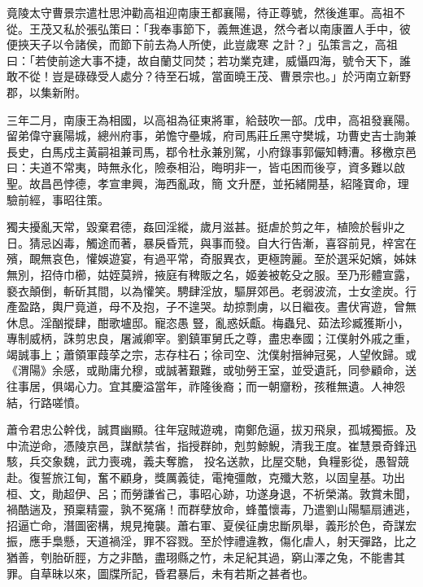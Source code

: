 \begin{pinyinscope}
 竟陵太守曹景宗遣杜思沖勸高祖迎南康王都襄陽，待正尊號，然後進軍。高祖不從。王茂又私於張弘策曰：「我奉事節下，義無進退，然今者以南康置人手中，彼便挾天子以令諸侯，而節下前去為人所使，此豈歲寒
 之計？」弘策言之，高祖曰：「若使前途大事不捷，故自蘭艾同焚；若功業克建，威懾四海，號令天下，誰敢不從！豈是碌碌受人處分？待至石城，當面曉王茂、曹景宗也。」於沔南立新野郡，以集新附。



 三年二月，南康王為相國，以高祖為征東將軍，給鼓吹一部。戊申，高祖發襄陽。留弟偉守襄陽城，總州府事，弟憺守壘城，府司馬莊丘黑守樊城，功曹史吉士詢兼長史，白馬戍主黃嗣祖兼司馬，鄀令杜永兼別駕，小府錄事郭儼知轉漕。移檄京邑曰：夫道不常夷，時無永化，險泰相沿，晦明非一，皆屯困而後亨，資多難以啟聖。故昌邑悖德，孝宣聿興，海西亂政，簡
 文升歷，並拓緒開基，紹隆寶命，理驗前經，事昭往策。



 獨夫擾亂天常，毀棄君德，姦回淫縱，歲月滋甚。挺虐於剪之年，植險於髫丱之日。猜忌凶毒，觸途而著，暴戾昏荒，與事而發。自大行告漸，喜容前見，梓宮在殯，靦無哀色，懽娛遊宴，有過平常，奇服異衣，更極誇麗。至於選采妃嬪，姊妹無別，招侍巾櫛，姑姪莫辨，掖庭有稗販之名，姬姜被乾殳之服。至乃形體宣露，褻衣顛倒，斬斫其間，以為懽笑。騁肆淫放，驅屏郊邑。老弱波流，士女塗炭。行產盈路，輿尸竟道，母不及抱，子不遑哭。劫掠剽虜，以日繼夜。晝伏宵遊，曾無休息。淫酗摐肆，酣歌壚邸。寵恣愚
 豎，亂惑妖甗。梅蟲兒、茹法珍臧獲斯小，專制威柄，誅剪忠良，屠滅卿宰。劉鎮軍舅氏之尊，盡忠奉國；江僕射外戚之重，竭誠事上；蕭領軍葭莩之宗，志存柱石；徐司空、沈僕射搢紳冠冕，人望攸歸。或《渭陽》余感，或勛庸允穆，或誠著艱難，或劬勞王室，並受遺託，同參顧命，送往事居，俱竭心力。宜其慶溢當年，祚隆後裔；而一朝齏粉，孩稚無遺。人神怨結，行路嗟憤。



 蕭令君忠公幹伐，誠貫幽顯。往年寇賊遊魂，南鄭危逼，拔刃飛泉，孤城獨振。及中流逆命，憑陵京邑，謀猷禁省，指授群帥，剋剪鯨鯢，清我王度。崔慧景奇鋒迅駭，兵交象魏，武力喪魂，義夫奪膽，
 投名送款，比屋交馳，負糧影從，愚智競赴。復誓旅江甸，奮不顧身，獎厲義徒，電掩彊敵，克殲大憝，以固皇基。功出桓、文，勛超伊、呂；而勞謙省己，事昭心跡，功遂身退，不祈榮滿。敦賞未聞，禍酷遄及，預稟精靈，孰不冤痛！而群孽放命，蜂蠆懷毒，乃遣劉山陽驅扇逋逃，招逼亡命，潛圖密構，規見掩襲。蕭右軍、夏侯征虜忠斷夙舉，義形於色，奇謀宏振，應手梟懸，天道禍淫，罪不容戮。至於悖禮違教，傷化虐人，射天彈路，比之猶善，刳胎斫脛，方之非酷，盡珝縣之竹，未足紀其過，窮山澤之兔，不能書其罪。自草昧以來，圖牒所記，昏君暴后，未有若斯之甚者也。




\end{pinyinscope}
